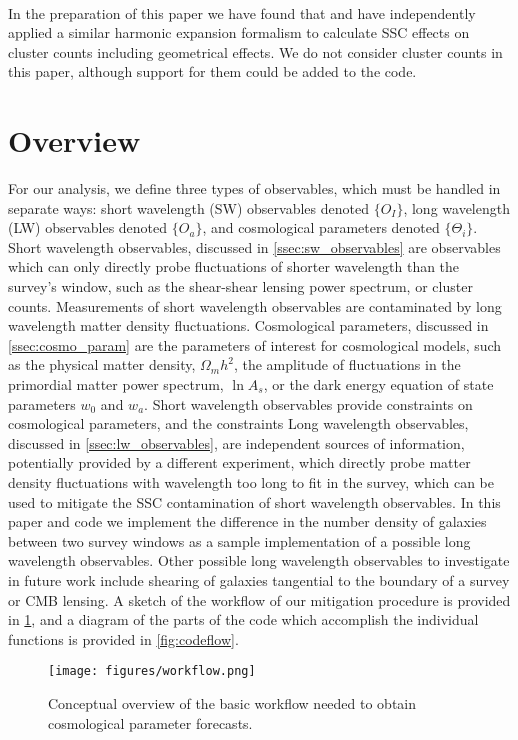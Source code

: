 \documentclass[a4paper,11pt]{article}
\begin{document}
 \\
 In the preparation of this paper we have found that \cite{lacasa_cluster_counts} and \cite{lacasa_partial_sky} have independently applied a similar harmonic expansion formalism to calculate SSC effects on cluster counts including geometrical effects. We do not consider cluster counts in this paper, although support for them could be added to the code. 
\section{Overview}
\label{sec:Overview}

For our analysis, we define three types of observables, which must be handled in separate ways: short wavelength (SW) observables denoted $\{O_I\}$, long wavelength (LW) observables denoted $\{O_a\}$, and cosmological parameters denoted $\{\Theta_i\}$. Short wavelength observables, discussed in \ref{ssec:sw_observables} are observables which can only directly probe fluctuations of shorter wavelength than the survey's window, such as the shear-shear lensing power spectrum, or cluster counts. Measurements of short wavelength observables are contaminated by long wavelength matter density fluctuations. Cosmological parameters, discussed in \ref{ssec:cosmo_param} are the parameters of interest for cosmological models, such as the physical matter density, $\Omega_m h^2$, the amplitude of fluctuations in the primordial matter power spectrum, $\ln{A_s}$, or the dark energy equation of state parameters $w_0$ and $w_a$. Short wavelength observables provide constraints on cosmological parameters, and the constraints  Long wavelength observables, discussed in \ref{ssec:lw_observables}, are independent sources of information, potentially provided by a different experiment, which directly probe matter density fluctuations with wavelength too long to fit in the survey, which can be used to mitigate the SSC contamination of short wavelength observables. In this paper and code we implement the difference in the number density of galaxies between two survey windows as a sample implementation of a possible long wavelength observables. Other possible long wavelength observables to investigate in future work include shearing of galaxies tangential to the boundary of a survey or CMB lensing. A sketch of the workflow of our mitigation procedure is provided in \ref{fig:workflow}, and a diagram of the parts of the code which accomplish the individual functions is provided in \ref{fig:codeflow}.
\\
\begin{figure}[!ht]
 \centering
\texttt{[image: figures/workflow.png]}
  \caption{Conceptual overview of the basic workflow needed to obtain cosmological parameter forecasts. }
\label{fig:workflow}
\end{figure}
\end{document}
